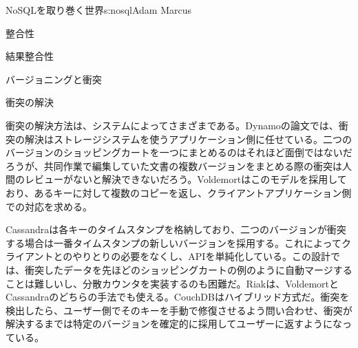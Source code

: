 \begin{aosachapter}{NoSQLを取り巻く世界}{s:nosql}{Adam Marcus}
\begin{aosasect1}{整合性}
\begin{aosasect2}{結果整合性}
\begin{aosasect3}{バージョニングと衝突}
\end{aosasect3}

\begin{aosasect3}{衝突の解決}

衝突の解決方法は、システムによってさまざまである。Dynamoの論文では、衝突の解決はストレージシステムを使うアプリケーション側に任せている。二つのバージョンのショッピングカートを一つにまとめるのはそれほど面倒ではないだろうが、共同作業で編集していた文書の複数バージョンをまとめる際の衝突は人間のレビューがないと解決できないだろう。Voldemortはこのモデルを採用しており、あるキーに対して複数のコピーを返し、クライアントアプリケーション側での対応を求める。

Cassandraは各キーのタイムスタンプを格納しており、二つのバージョンが衝突する場合は一番タイムスタンプの新しいバージョンを採用する。これによってクライアントとのやりとりの必要をなくし、APIを単純化している。この設計では、衝突したデータを先ほどのショッピングカートの例のように自動マージすることは難しいし、分散カウンタを実装するのも困難だ。Riakは、VoldemortとCassandraのどちらの手法でも使える。CouchDBはハイブリッド方式だ。衝突を検出したら、ユーザー側でそのキーを手動で修復させるよう問い合わせ、衝突が解決するまでは特定のバージョンを確定的に採用してユーザーに返すようになっている。

\end{aosasect3}


\end{aosasect2}
\end{aosasect1}
\end{aosachapter}
